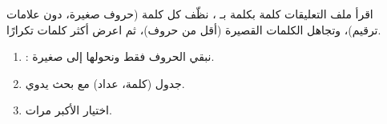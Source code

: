 \begin{statement}
اقرأ ملف التعليقات كلمة بكلمة بـ ، نظّف كل كلمة (حروف صغيرة، دون علامات ترقيم)، وتجاهل الكلمات القصيرة (أقل من  حروف)، ثم اعرض أكثر  كلمات تكرارًا.
\end{statement}
\begin{stepsbox}\begin{enumerate}
\item {}: نبقي الحروف فقط ونحولها إلى صغيرة.
\item جدول (كلمة، عداد) مع بحث يدوي.
\item اختيار الأكبر  مرات.
\end{enumerate}\end{stepsbox}

